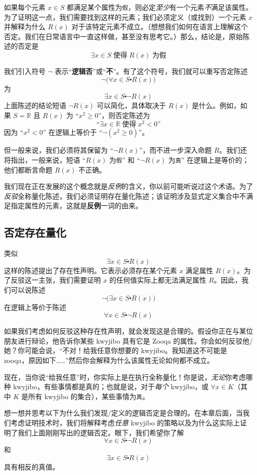 如果每个元素 $x \in S$ 都满足某个属性为\verb|假|，则必定\emph{至少}有一个元素\emph{不}满足该属性。为了证明这一点，我们需要找到这样的元素；我们必须定义（或找到）一个元素 $x$ 并解释为什么 $R(x)$ 对于该特定元素不成立。（想想我们如何在语言上理解这个否定。我们在日常语言中一直这样做，甚至没有思考它。）那么，结论是，原始陈述的否定是
\[\exists x \in S \;\text{使得}\; R(x) \;\text{为假}\]

我们引入符号 $\neg$ 表示``\textbf{逻辑否}''或``\textbf{不}''。有了这个符号，我们就可以重写否定陈述
\[\neg\big(\forall x \in S \centerdot R(x)\big)\]
为
\[\exists x \in S \centerdot \neg R(x)\]
上面陈述的结论短语 $\neg R(x)$ 可以简化，具体取决于 $R(x)$ 是什么。例如，如果 $S = \mathbb{R}$ 且 $R(x)$ 为 ``$x^2 \ge 0$''，则否定陈述为
\[\text{``}\exists x \in \mathbb{R} \;\text{使得}\; x^2 < 0 \text{''}\]
因为 ``$x^2 < 0$'' 在逻辑上等价于 ``$\neg(x^2 \ge 0)$''。

但一般来说，我们必须将其保留为 ``$\neg R(x)$''，而不进一步深入命题 $R$。我们还将指出，一般来说，短语 ``$R(x)$ 为\verb|假|'' 和 ``$\neg R(x)$ 为\verb|真|'' 在逻辑上是等价的；他们都断言命题 $R(x)$ 不正确。

我们现在正在发展的这个概念就是\emph{反例}的含义，你以前可能听说过这个术语。为了\emph{反驳}全称量化陈述，我们必须证明存在量化陈述；该证明涉及显式定义集合中不满足指定属性的元素，这就是\textbf{反例}一词的由来。

\subsection{否定存在量化}

类似 
\[\exists x \in S \centerdot R(x)\] 
这样的陈述提出了存在性声明。它表示必须存在某个元素 $x$ 满足属性 $R(x)$。为了反驳这一主张，我们需要证明 $x$ 的任何值实际上都无法满足属性 $R$。因此，我们可以说陈述
\[\neg\big(\exists x \in S \centerdot R(x)\big)\]
在逻辑上等价于陈述 
\[\forall x \in S \centerdot \neg R(x)\]

如果我们考虑如何反驳这种存在性声明，就会发现这是合理的。假设你正在与某位朋友进行辩论，他告诉你某些 kwyjibo 具有它是 Zooqa 的属性。你会如何反驳他/她？你可能会说，``不对！给我任意你想要的 kwyjibo。我知道这不可能是 zooqa，原因如下……''然后你会解释为什么该属性无论如何都不成立。

现在，当你说``给我任意''时，你实际上是在执行全称量化！你是说，\emph{无论}你考虑哪种 kwyjibo，有些事情都是真的；也就是说，对于\emph{每个} kwyjibo，或 $\forall x \in K$（其中 $K$ 是所有 kwyjibo 的集合），某些事情为\verb|真|。

想一想并思考以下为什么我们发现/定义的逻辑否定是合理的。在本章后面，当我们考虑证明技术时，我们将解释考虑\emph{任意} kwyjibo 的策略以及为什么这实际上证明了我们上面刚刚写出的逻辑否定。眼下，我们希望你了解
\[\forall x \in S \centerdot \neg R(x)\] 
和
\[\exists x \in S \centerdot R(x)\]
具有相反的真值。

